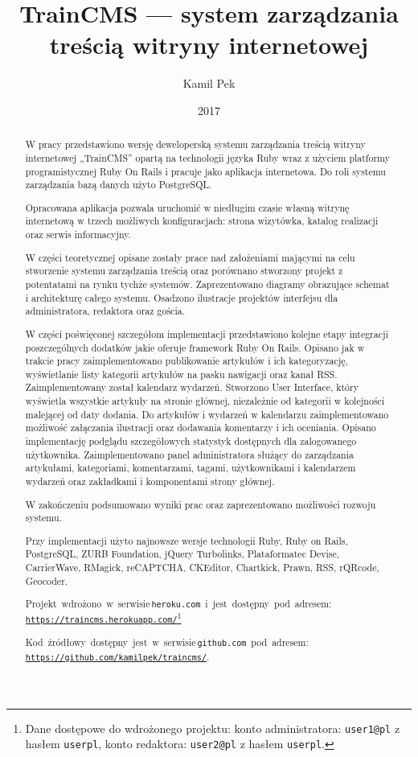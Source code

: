 \documentclass[openright]{xmgr}
\author   {Kamil Pek}
\title    {TrainCMS --- system zarządzania treścią witryny internetowej}
\date     {2017}
\begin{document}
\begin{abstract}
W pracy przedstawiono wersję deweloperską systemu zarządzania treścią witryny internetowej  „TrainCMS” opartą na technologii języka Ruby wraz z użyciem platformy programistycznej Ruby On Rails i pracuje jako aplikacja internetowa. Do roli systemu zarządzania bazą danych użyto PostgreSQL.

Opracowana aplikacja pozwala uruchomić w niedługim czasie własną witrynę internetową w trzech możliwych konfiguracjach: strona wizytówka, katalog realizacji oraz serwis informacyjny.

W części teoretycznej opisane zostały prace nad założeniami mającymi na celu stworzenie systemu zarządzania treścią oraz porównano stworzony projekt z potentatami na rynku tychże systemów. Zaprezentowano diagramy obrazujące schemat i architekturę całego systemu. Osadzono ilustracje projektów interfejsu dla administratora, redaktora oraz gościa.

W części poświęconej szczegółom implementacji przedstawiono kolejne etapy integracji poszczególnych dodatków jakie oferuje framework Ruby On Rails. Opisano jak w trakcie pracy zaimplementowano publikowanie artykułów i ich kategoryzację, wyświetlanie listy kategorii artykułów na pasku nawigacji oraz kanał RSS. Zaimplementowany został kalendarz wydarzeń. Stworzono User Interface, który wyświetla wszystkie artykuły na stronie głównej, niezależnie od kategorii w kolejności malejącej od daty dodania. Do artykułów i wydarzeń w kalendarzu zaimplementowano możliwość załączania ilustracji oraz dodawania komentarzy i ich oceniania. Opisano implementację podglądu szczegółowych statystyk dostępnych dla zalogowanego użytkownika. Zaimplementowano panel administratora służący do zarządzania artykułami, kategoriami, komentarzami, tagami, użytkownikami i kalendarzem wydarzeń oraz zakładkami i komponentami strony głównej.

W zakończeniu podsumowano wyniki prac oraz zaprezentowano możliwości rozwoju systemu.

Przy implementacji użyto najnowsze wersje technologii Ruby, Ruby on Rails, PostgreSQL, ZURB Foundation, jQuery Turbolinks, Plataformatec Devise, CarrierWave, RMagick, reCAPTCHA, CKEditor, Chartkick, Prawn, RSS, rQRcode, Geocoder.

\mbox{Projekt wdrożono w serwisie\, \\\texttt{heroku.com} i jest dostępny pod adresem:} \\\texttt{\url{https://traincms.herokuapp.com/}}\footnote{Dane dostępowe do wdrożonego projektu: konto administratora: \texttt{user1@pl} z hasłem \texttt{userpl}, konto redaktora: \texttt{user2@pl} z hasłem \texttt{userpl}.}

\mbox{Kod źródłowy dostępny jest w serwisie\, \\\texttt{github.com} pod adresem:} \\\texttt{\url{https://github.com/kamilpek/traincms/}}.
\end{abstract}
\end{document}
